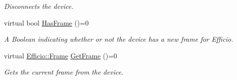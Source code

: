 \begin{DoxyCompactItemize}
\begin{DoxyCompactList}\small\item\em Disconnects the device. \end{DoxyCompactList}\item 
virtual bool \hyperlink{class_efficio_1_1_device_a43eda953d99df9ee4df66df44c205773}{Has\+Frame} ()=0\hypertarget{class_efficio_1_1_device_a43eda953d99df9ee4df66df44c205773}{}\label{class_efficio_1_1_device_a43eda953d99df9ee4df66df44c205773}

\begin{DoxyCompactList}\small\item\em A Boolean indicating whether or not the device has a new frame for Efficio. \end{DoxyCompactList}\item 
virtual \hyperlink{class_efficio_1_1_frame}{Efficio\+::\+Frame} \hyperlink{class_efficio_1_1_device_a02e921f409f834a71194720006ab22ef}{Get\+Frame} ()=0\hypertarget{class_efficio_1_1_device_a02e921f409f834a71194720006ab22ef}{}\label{class_efficio_1_1_device_a02e921f409f834a71194720006ab22ef}

\begin{DoxyCompactList}\small\item\em Gets the current frame from the device. \end{DoxyCompactList}\end{DoxyCompactItemize}
